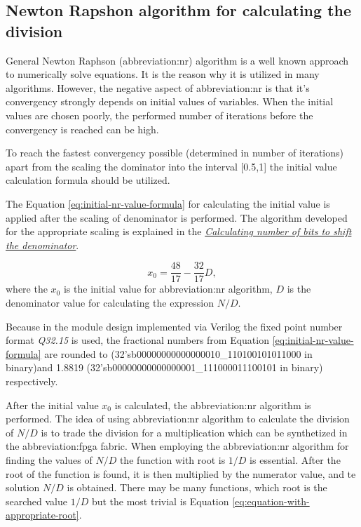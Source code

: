 \documentclass[a4paper, twoside, 11pt]{article}
\begin{document}
\subsection{Newton Rapshon algorithm for calculating the division}\label{subsection:newton-raphson-algorithm-for-calculating-the-division}
General Newton Raphson (\gls{abbreviation:nr}) algorithm is a well known approach to numerically solve equations. It is the reason why it is utilized in many algorithms. However, the negative aspect of \gls{abbreviation:nr} is that it's convergency strongly depends on initial values of variables. When the initial values are chosen poorly, the performed number of iterations before the convergency is reached can be high.\par
To reach the fastest convergency possible (determined in number of iterations) apart from the scaling the dominator into the interval [0.5,1] the initial value calculation formula should be utilized. \cite{burke-fixed-point-math-library}\par
The Equation \ref{eq:initial-nr-value-formula} for calculating the initial value  is applied after the scaling of denominator is performed. The algorithm developed for the appropriate scaling is explained in the \hyperref[subsec:calculating-number-of-bits-to-shift-the-denominator]{\textit{Calculating number of bits to shift the denominator}}.

\begin{equation}\label{eq:initial-nr-value-formula}
x_0 = \frac{48}{17} - \frac{32}{17} D,
\end{equation}
where the $x_0$ is the initial value for \gls{abbreviation:nr} algorithm, $D$ is the denominator value for calculating the expression $N/D$.\par
Because in the module design implemented via Verilog the fixed point number format \textit{Q32.15} is used, the fractional numbers from Equation \ref{eq:initial-nr-value-formula} are rounded to (32'sb00000000000000010\_110100101011000 in binary)\newline and 1.8819 (32'sb00000000000000001\_111000011100101 in binary) respectively.\par
After the initial value $x_0$ is calculated, the \gls{abbreviation:nr} algorithm is performed. The idea of using \gls{abbreviation:nr} algorithm to calculate the division of $N/D$ is to trade the division for a multiplication which can be synthetized in the \gls{abbreviation:fpga} fabric. When employing the \gls{abbreviation:nr} algorithm for finding the values of $N/D$ the function with root is $1/D$ is essential. After the root of the function is found, it is then multiplied by the numerator value, and te solution $N/D$ is obtained. There may be many functions, which root is the searched value $1/D$ but the most trivial is Equation \ref{eq:equation-with-appropriate-root}.\par
\end{document}
